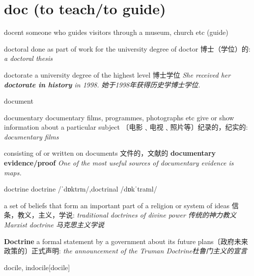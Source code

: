 \section{doc (to teach/to guide)}

\begin{DefWord}{docent}
    someone who guides visitors through a museum, church etc (guide)
\end{DefWord}

\begin{DefWord}{doctoral}
    done as part of work for the university degree of doctor
    博士（学位）的:
    \textit{a doctoral thesis}
\end{DefWord}

\begin{DefWord}{doctorate}
    a university degree of the highest level 博士学位
    \textit{She received her \textbf{doctorate in history} in 1998. 她于1998年获得历史学博士学位. }
\end{DefWord}


\begin{DefWord}{document}
\end{DefWord}

\begin{DefWord}{documentary}
    documentary films, programmes, photographs etc give or show information about a particular subject
    〔电影﹑电视﹑照片等〕纪录的，纪实的:
    \textit{documentary films}

    consisting of or written on documents
    文件的，文献的
    \textbf{documentary evidence/proof}
    \textit{One of the most useful sources of documentary evidence is maps.}
\end{DefWord}

\begin{DefWord}{doctrine}
    doctrine /ˈdɒktrɪn/,doctrinal /dɒkˈtraɪnl/

    a set of beliefs that form an important part of a religion or system of ideas
    信条，教义，主义，学说:
    \textit{traditional doctrines of divine power 传统的神力教义}
    \textit{Marxist doctrine 马克思主义学说}

    \textbf{Doctrine}  a formal statement by a government about its future plans〔政府未来政策的〕正式声明:
    \textit{the announcement of the Truman Doctrine杜鲁门主义的宣言}
\end{DefWord}

\begin{DefWord}{docile, indocile}[docile]
\end{DefWord}